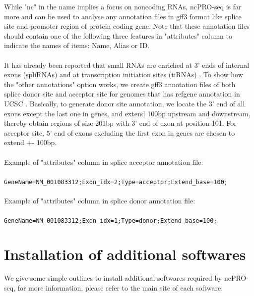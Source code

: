 \documentclass[12pt]{article}
\def \ncpip{ncPRO-seq}
\begin{document}
While "nc" in the name implies a focus on noncoding RNAs, \ncpip{} is far more and can be used to analyse any annotation files in gff3 format like splice site and promoter region of protein coding gene. Note that these annotation files should contain one of the following three features in "attributes" column to indicate the names of items: Name, Alias or ID. \\\\
It has already been reported that small RNAs are enriched at 3' ends of internal exons (spliRNAs) and at transcription initiation sites (tiRNAs) \cite{Taft2010}. To show how the "other annotations" option works, we create gff3 annotation files of both splice donor site and acceptor site for genomes that has refgene annotation in UCSC \cite{Dreszer2012}. Basically, to generate donor site annotation, we locate the 3' end of all exons except the last one in genes, and extend 100bp upstream and downstream, thereby obtain regions of size 201bp with 3' end of exon at position 101. For acceptor site, 5' end of exons excluding the first exon in genes are chosen to extend +- 100bp. \\\\
Example of "attributes" column in splice acceptor annotation file:\\\\
\verb|GeneName=NM_001083312;Exon_idx=2;Type=acceptor;Extend_base=100;|\\\\
Example of "attributes" column in splice donor annotation file:\\\\
\verb|GeneName=NM_001083312;Exon_idx=1;Type=donor;Extend_base=100;|

\section{Installation of additional softwares}
\label{subsection:additional}

We give some simple outlines to install additional softwares required by \ncpip{}, for more information, please refer to the main site of each software:
\end{document}

